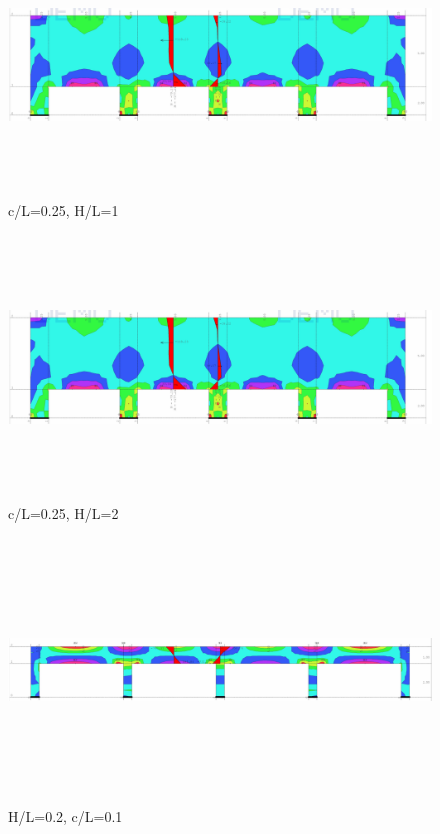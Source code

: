 \documentclass[11pt, a4paper]{article}
\begin{document}
\begin{figure}[H]
	\includegraphics[width=\textwidth, height=7cm]{Slike/C-L_0-25 (1-0).png}
	\caption{c/L=0.25, H/L=1}
\end{figure}

\begin{figure}[H]
	\includegraphics[width=\textwidth, height=7cm]{Slike/C-L_0-25 (1-0).png}
	\caption{c/L=0.25, H/L=2}
\end{figure}
\newpage
\begin{figure}[H]
	\includegraphics[width=\textwidth, height=7cm]{Slike/H-L_0-2 (0-1).png}
	\caption{H/L=0.2, c/L=0.1}
\end{figure}
\end{document}
